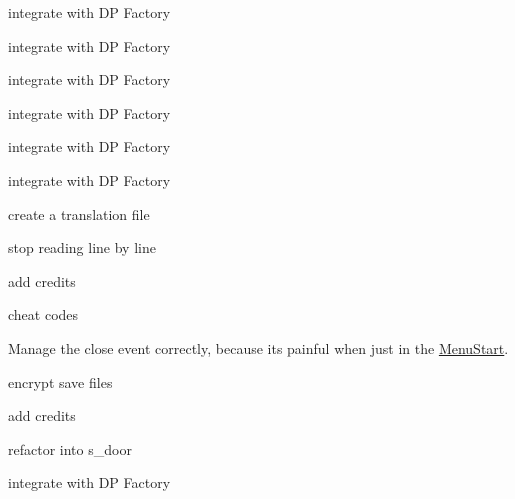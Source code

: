 
\begin{DoxyRefList}
\item[\label{todo__todo000001}%
\hypertarget{todo__todo000001}{}%
Class \hyperlink{class_b___movable}{B\+\_\+\+Movable} ]integrate with D\+P Factory  
\item[\label{todo__todo000002}%
\hypertarget{todo__todo000002}{}%
Class \hyperlink{class_b___wall}{B\+\_\+\+Wall} ]integrate with D\+P Factory  
\item[\label{todo__todo000003}%
\hypertarget{todo__todo000003}{}%
Class \hyperlink{class_b___water}{B\+\_\+\+Water} ]integrate with D\+P Factory  
\item[\label{todo__todo000004}%
\hypertarget{todo__todo000004}{}%
Class \hyperlink{class_e___loup}{E\+\_\+\+Loup} ]integrate with D\+P Factory  
\item[\label{todo__todo000005}%
\hypertarget{todo__todo000005}{}%
Class \hyperlink{class_e___renard}{E\+\_\+\+Renard} ]integrate with D\+P Factory  
\item[\label{todo__todo000006}%
\hypertarget{todo__todo000006}{}%
Class \hyperlink{class_ennemi}{Ennemi} ]integrate with D\+P Factory  
\item[\label{todo__todo000008}%
\hypertarget{todo__todo000008}{}%
Class \hyperlink{class_gameboard}{Gameboard} ]create a translation file  
\item[\label{todo__todo000012}%
\hypertarget{todo__todo000012}{}%
Class \hyperlink{class_level}{Level} ]stop reading line by line  
\item[\label{todo__todo000014}%
\hypertarget{todo__todo000014}{}%
Class \hyperlink{class_m___pause}{M\+\_\+\+Pause} ]add credits 

cheat codes  
\item[\label{todo__todo000015}%
\hypertarget{todo__todo000015}{}%
Class \hyperlink{class_main_game}{Main\+Game} ]Manage the close event correctly, because it\textquotesingle{}s painful when just in the \hyperlink{class_menu_start}{Menu\+Start}.  
\item[\label{todo__todo000013}%
\hypertarget{todo__todo000013}{}%
Class \hyperlink{class_menu_start}{Menu\+Start} ]encrypt save files 

add credits  
\item[\label{todo__todo000016}%
\hypertarget{todo__todo000016}{}%
Class \hyperlink{class_s___view_transition}{S\+\_\+\+View\+Transition} ]refactor into s\+\_\+door  
\item[\label{todo__todo000007}%
\hypertarget{todo__todo000007}{}%
Class \hyperlink{structslide_bloc}{slide\+Bloc} ]integrate with D\+P Factory 
\end{DoxyRefList}